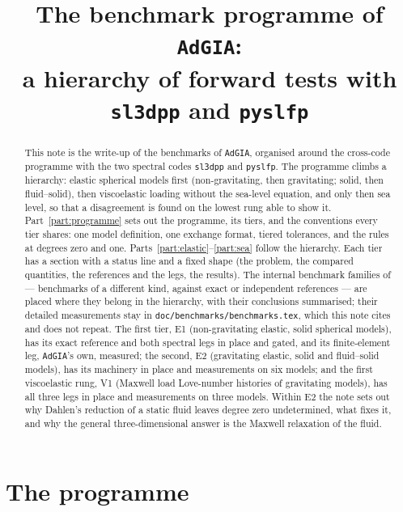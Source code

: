 \documentclass[11pt]{article}
\title{The benchmark programme of \texttt{AdGIA}:\\
       a hierarchy of forward tests with \texttt{sl3dpp} and \texttt{pyslfp}}
\author{}
\date{}
\numberwithin{equation}{section}
\newcommand{\code}[1]{\texttt{#1}}
\begin{document}
\maketitle

\begin{abstract}
\noindent
This note is the write-up of the benchmarks of \code{AdGIA}, organised
around the cross-code programme with the two
spectral codes \code{sl3dpp} and \code{pyslfp}. The programme climbs a
hierarchy: elastic spherical models first (non-gravitating, then
gravitating; solid, then fluid--solid), then viscoelastic loading without
the sea-level equation, and only then sea level, so that a disagreement is
found on the lowest rung able to show it. Part~\ref{part:programme} sets out
the programme, its tiers, and the conventions every tier
shares: one model definition, one exchange format, tiered tolerances, and
the rules at degrees zero and one. Parts~\ref{part:elastic}--\ref{part:sea}
follow the hierarchy. Each tier has a section with a status line and
a fixed shape (the problem, the compared quantities, the references and the
legs, the results). The internal benchmark families
of  --- benchmarks of a different kind, against exact or
independent references --- are placed where they belong in the hierarchy,
with their conclusions summarised; their detailed measurements stay in
\code{doc/benchmarks/benchmarks.tex}, which this note cites and does not repeat. The
first tier, E1 (non-gravitating elastic, solid
spherical models), has its exact reference and both spectral legs in place
and gated, and its finite-element leg, \code{AdGIA}'s own, measured;
the second, E2 (gravitating elastic, solid and fluid--solid
models), has its machinery in place and measurements on six models;
and the first viscoelastic rung, V1 (Maxwell load Love-number histories of
gravitating models), has all three legs in place and measurements on
three models. Within E2 the note sets out why Dahlen's reduction of a static fluid leaves
degree zero undetermined, what fixes it, and why the general
three-dimensional answer is the Maxwell relaxation of the fluid.
\end{abstract}

\tableofcontents

\part{The programme}
\label{part:programme}
\end{document}
